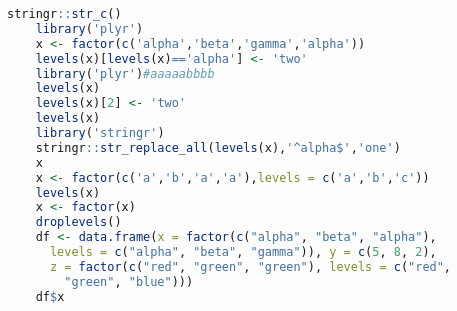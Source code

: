 \documentclass[11pt,a4paper]{ctexart}
\numberwithin{equation}{section}%
\begin{document}
\begin{lstlisting}[language=R]
    stringr::str_c()
    library('plyr')
    x <- factor(c('alpha','beta','gamma','alpha'))
    levels(x)[levels(x)=='alpha'] <- 'two'
    library('plyr')#aaaaabbbb
    levels(x)
    levels(x)[2] <- 'two'
    levels(x)
    library('stringr')
    stringr::str_replace_all(levels(x),'^alpha$','one')
    x
    x <- factor(c('a','b','a','a'),levels = c('a','b','c'))
    levels(x)
    x <- factor(x)
    droplevels()
    df <- data.frame(x = factor(c("alpha", "beta", "alpha"), 
      levels = c("alpha", "beta", "gamma")), y = c(5, 8, 2), 
      z = factor(c("red", "green", "green"), levels = c("red", 
        "green", "blue")))
    df$x

\end{lstlisting} 
\end{document}
